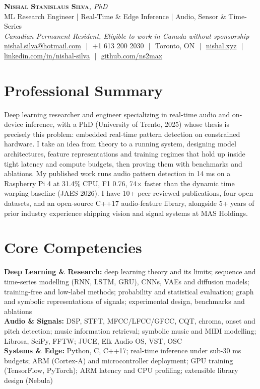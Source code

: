 \documentclass[11pt]{article}
\makeatletter
\newcommand{\cvName}{Nishal Stanislaus Silva}
\newcommand{\cvEmail}{nishal.silva@hotmail.com}
\newcommand{\cvPhone}{+1 613 200 2030}
\newcommand{\cvCity}{Toronto, ON}
\newcommand{\cvSite}{https://nishal.xyz}
\newcommand{\cvLinkedIn}{https://www.linkedin.com/in/nishal-silva}
\newcommand{\cvGitHub}{https://github.com/ns2max}
\newcommand{\cvStatus}{Canadian Permanent Resident, Eligible to work in Canada without sponsorship}
\newcommand{\cvTagline}{ML Research Engineer | Real-Time \& Edge Inference | Audio, Sensor \& Time-Series}
\makeatother
\begin{document}
\pagestyle{empty}

\begin{center}
    {\LARGE \scshape \textbf{\cvName}}{\large \textit{, PhD}}
    \\[1pt]
    {\small \cvTagline}
    \\[1pt]
    {\footnotesize\textit{\cvStatus}}
    \\[1pt]
    {\small
    \href{mailto:\cvEmail}{\cvEmail}
    \,\,|\,\, \cvPhone
    \,\,|\,\, \cvCity
    \,\,|\,\, \href{\cvSite}{nishal.xyz}
    \,\,|\,\, \href{\cvLinkedIn}{linkedin.com/in/nishal-silva}
    \,\,|\,\, \href{\cvGitHub}{github.com/ns2max}}
\end{center}

\section*{Professional Summary}

Deep learning researcher and engineer specializing in real-time audio and on-device inference, with a PhD (University of Trento, 2025) whose thesis is precisely this problem: embedded real-time pattern detection on constrained hardware. I take an idea from theory to a running system, designing model architectures, feature representations and training regimes that hold up inside tight latency and compute budgets, then proving them with benchmarks and ablations. My published work runs audio pattern detection in 14 ms on a Raspberry Pi 4 at 31.4\% CPU, F1 0.76, 74$\times$ faster than the dynamic time warping baseline (JAES 2026). I have 10+ peer-reviewed publications, four open datasets, and an open-source C++17 audio-feature library, alongside 5+ years of prior industry experience shipping vision and signal systems at MAS Holdings.

\section*{Core Competencies}

\textbf{Deep Learning \& Research:} deep learning theory and its limits; sequence and time-series modelling (RNN, LSTM, GRU), CNNs, VAEs and diffusion models; training-free and low-label methods; probability and statistical evaluation; graph and symbolic representations of signals; experimental design, benchmarks and ablations\\
\textbf{Audio \& Signals:} DSP, STFT, MFCC/LFCC/GFCC, CQT, chroma, onset and pitch detection; music information retrieval; symbolic music and MIDI modelling; Librosa, SciPy, FFTW; JUCE, Elk Audio OS, VST, OSC\\
\textbf{Systems \& Edge:} Python, C, C++17; real-time inference under sub-30 ms budgets; ARM (Cortex-A) and microcontroller deployment; GPU training (TensorFlow, PyTorch); ARM latency and CPU profiling; extensible library design (Nebula)
\end{document}
